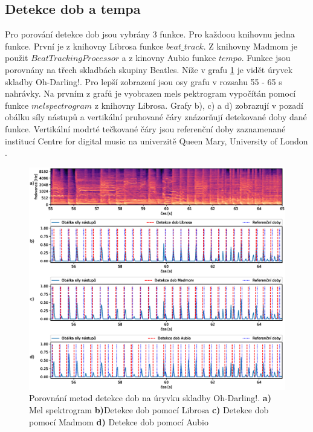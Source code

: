 \subsection{Detekce dob a tempa}
Pro porování detekce dob jsou vybrány 3 funkce. Pro každoou knihovnu jedna funkce. První je z knihovny Librosa funkce $beat\_track$. Z knihovny Madmom je použit $BeatTrackingProcessor$ a z kinovny Aubio funkce $tempo$. Funkce jsou porovnány na třech skladbách skupiny Beatles. Níže v grafu \ref{fig:Oh-Darling_beat_analysis} je vidět úryvek skladby Oh-Darling!. Pro lepší zobrazení jsou osy grafu v rozsahu 55 - 65 s nahrávky. Na prvním z grafů je vyobrazen mels pektrogram vypočítán pomocí funkce $melspectrogram$ z knihovny Librosa. Grafy b), c) a d) zobrazují v pozadí obálku síly nástupů a vertikální pruhované čáry znázorňují detekované doby dané funkce. Vertikální modrté tečkované čáry jsou referenční doby zaznamenané institucí Centre for digital music na univerzitě Queen Mary, University of London \cite{Isophonic}. 

\begin{figure}[H]
    \centering
    \includegraphics[width = 1\linewidth]{obrazky/Oh-Darling_Beat_analysis_graphs.eps}
    \caption{Porovnání metod detekce dob na úryvku skladby Oh-Darling!. \textbf{a)} Mel spektrogram \textbf{b)}Detekce dob pomocí Librosa \textbf{c)} Detekce dob pomocí Madmom \textbf{d)} Detekce dob pomocí Aubio}
    \label{fig:Oh-Darling_beat_analysis}
\end{figure}

